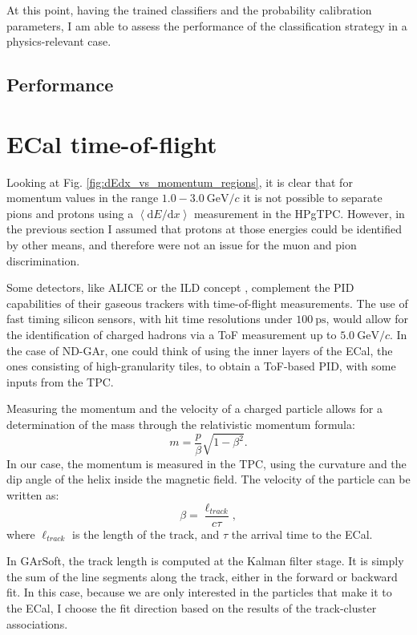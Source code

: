 At this point, having the trained classifiers and the probability calibration parameters, I am able to assess the performance of the classification strategy in a physics-relevant case.

\subsection{Performance}

\section{ECal time-of-flight}\label{section:tof}

Looking at Fig. \ref{fig:dEdx_vs_momentum_regions}, it is clear that for momentum values in the range $1.0-3.0 ~ \mathrm{GeV}/c$ it is not possible to separate pions and protons using a $\left<\mathrm{d}E/\mathrm{d}x\right>$ measurement in the HPgTPC. However, in the previous section I assumed that protons at those energies could be identified by other means, and therefore were not an issue for the muon and pion discrimination.

Some detectors, like ALICE \cite{ALICE2011} or the ILD concept \cite{Einhaus2021}, complement the PID capabilities of their gaseous trackers with time-of-flight measurements. The use of fast timing silicon sensors, with hit time resolutions under $100~\mathrm{ps}$, would allow for the identification of charged hadrons via a ToF measurement up to $5.0 ~ \mathrm{GeV}/c$. In the case of ND-GAr, one could think of using the inner layers of the ECal, the ones consisting of high-granularity tiles, to obtain a ToF-based PID, with some inputs from the TPC.

Measuring the momentum and the velocity of a charged particle allows for a determination of the mass through the relativistic momentum formula:
\begin{equation}\label{8.19}
	m = \frac{p}{\beta} \sqrt{1-\beta^{2}}.
\end{equation}
In our case, the momentum is measured in the TPC, using the curvature and the dip angle of the helix inside the magnetic field. The velocity of the particle can be written as:
\begin{equation}
	\beta = \frac{\ell_{track}}{c \tau},
\end{equation}
where $\ell_{track}$ is the length of the track, and $\tau$ the arrival time to the ECal.

In GArSoft, the track length is computed at the Kalman filter stage. It is simply the sum of the line segments along the track, either in the forward or backward fit. In this case, because we are only interested in the particles that make it to the ECal, I choose the fit direction based on the results of the track-cluster associations.

